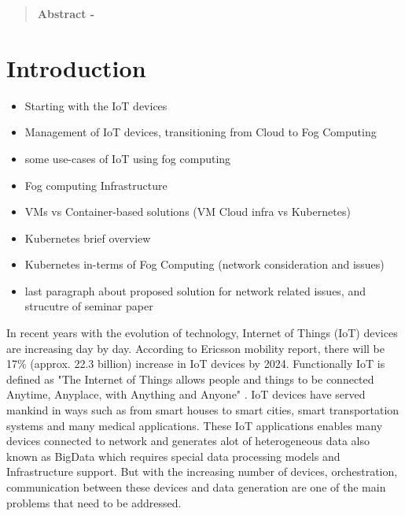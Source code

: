 %
%


\begin{abstract}
\textbf{Abstract - }
\end{abstract}


\section{Introduction}
\label{sec:introduction}
\begin{itemize}
  \item Starting with the IoT devices
  \item Management of IoT devices, transitioning from Cloud to Fog Computing
  \item some use-cases of IoT using fog computing
  \item Fog computing Infrastructure
  \item VMs vs Container-based solutions (VM Cloud infra vs Kubernetes)
  \item Kubernetes brief overview
  \item Kubernetes in-terms of Fog Computing (network consideration and issues)
  \item last paragraph about proposed solution for network related issues, and strucutre of seminar paper
\end{itemize}
In recent years with the evolution of technology, Internet of Things (IoT) devices are increasing day by day. According to Ericsson mobility report\cite{}, there will be 17\% (approx. 22.3 billion) increase in IoT devices by 2024. Functionally IoT is defined as "The Internet of Things allows people and things to be connected Anytime, Anyplace, with Anything and Anyone" \cite{European commission 2008}. IoT devices have served mankind in ways such as from smart houses to smart cities, smart transportation systems and many medical applications. These IoT applications enables many devices connected to network and generates alot of heterogeneous data also known as BigData which requires special data processing models and Infrastructure support.
But with the increasing number of devices, orchestration, communication between these devices and data generation are one of the main problems that need to be addressed. 

